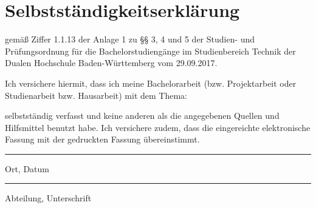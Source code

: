 \section*{\Huge{Selbstständigkeitserklärung}}
gemäß Ziffer 1.1.13 der Anlage 1 zu §§ 3, 4 und 5  der Studien- und Prüfungsordnung für die Bachelorstudiengänge im Studienbereich Technik der Dualen Hochschule Baden-Würt­tem­berg vom 29.09.2017.

\noindent Ich versichere hiermit, dass ich meine Bachelorarbeit (bzw. Projektarbeit oder Studienarbeit bzw. Hausarbeit) mit dem Thema: 
\begin{center}
	\Large\textbf{\vTitel}
\end{center}
selbstständig verfasst und keine anderen als die angegebenen Quellen und Hilfsmittel benutzt habe. Ich versichere zudem, dass die eingereichte elektronische Fassung mit der gedruckten Fassung übereinstimmt.

\vfill
\leavevmode
\newline
\parbox{6cm}{\hrule\strut\centering\footnotesize Ort, Datum} 
\hfill
\parbox{6cm}{\hspace{1pt} \vAbteilung\hrule\strut\centering\footnotesize Abteilung, Unterschrift}

\newpage